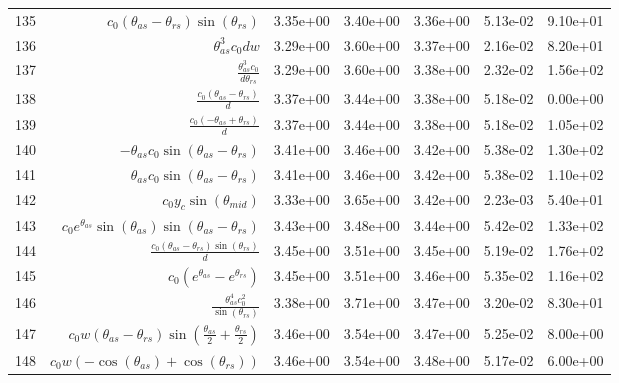 \begin{tabularx}{\textwidth}{lRRRRRl}
135  &  $ c_{0} \left(\theta_{as} - \theta_{rs}\right) \sin{\left(\theta_{rs} \right)} $  &  3.35e+00  &  3.40e+00  &  3.36e+00  &  5.13e-02  &  9.10e+01  \\ 
136  &  $ \theta_{as}^{3} c_{0} d w $  &  3.29e+00  &  3.60e+00  &  3.37e+00  &  2.16e-02  &  8.20e+01  \\ 
137  &  $ \displaystyle\frac{\theta_{as}^{3} c_{0}}{d \theta_{rs}} $  &  3.29e+00  &  3.60e+00  &  3.38e+00  &  2.32e-02  &  1.56e+02  \\ 
138  &  $ \displaystyle\frac{c_{0} \left(\theta_{as} - \theta_{rs}\right)}{d} $  &  3.37e+00  &  3.44e+00  &  3.38e+00  &  5.18e-02  &  0.00e+00  \\ 
139  &  $ \displaystyle\frac{c_{0} \left(- \theta_{as} + \theta_{rs}\right)}{d} $  &  3.37e+00  &  3.44e+00  &  3.38e+00  &  5.18e-02  &  1.05e+02  \\ 
140  &  $ - \theta_{as} c_{0} \sin{\left(\theta_{as} - \theta_{rs} \right)} $  &  3.41e+00  &  3.46e+00  &  3.42e+00  &  5.38e-02  &  1.30e+02  \\ 
141  &  $ \theta_{as} c_{0} \sin{\left(\theta_{as} - \theta_{rs} \right)} $  &  3.41e+00  &  3.46e+00  &  3.42e+00  &  5.38e-02  &  1.10e+02  \\ 
142  &  $ c_{0} y_c \sin{\left(\theta_{mid} \right)} $  &  3.33e+00  &  3.65e+00  &  3.42e+00  &  2.23e-03  &  5.40e+01  \\ 
143  &  $ c_{0} e^{\theta_{as}} \sin{\left(\theta_{as} \right)} \sin{\left(\theta_{as} - \theta_{rs} \right)} $  &  3.43e+00  &  3.48e+00  &  3.44e+00  &  5.42e-02  &  1.33e+02  \\ 
144  &  $ \displaystyle\frac{c_{0} \left(\theta_{as} - \theta_{rs}\right) \sin{\left(\theta_{rs} \right)}}{d} $  &  3.45e+00  &  3.51e+00  &  3.45e+00  &  5.19e-02  &  1.76e+02  \\ 
145  &  $ c_{0} \left(e^{\theta_{as}} - e^{\theta_{rs}}\right) $  &  3.45e+00  &  3.51e+00  &  3.46e+00  &  5.35e-02  &  1.16e+02  \\ 
146  &  $ \displaystyle\frac{\theta_{as}^{4} c_{0}^{2}}{\sin{\left(\theta_{rs} \right)}} $  &  3.38e+00  &  3.71e+00  &  3.47e+00  &  3.20e-02  &  8.30e+01  \\ 
147  &  $ c_{0} w \left(\theta_{as} - \theta_{rs}\right) \sin{\left(\displaystyle\frac{\theta_{as}}{2} + \displaystyle\frac{\theta_{rs}}{2} \right)} $  &  3.46e+00  &  3.54e+00  &  3.47e+00  &  5.25e-02  &  8.00e+00  \\ 
148  &  $ c_{0} w \left(- \cos{\left(\theta_{as} \right)} + \cos{\left(\theta_{rs} \right)}\right) $  &  3.46e+00  &  3.54e+00  &  3.48e+00  &  5.17e-02  &  6.00e+00  \\ 

\end{tabularx}

